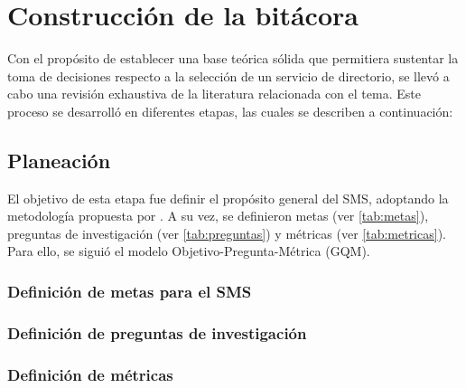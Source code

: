 \section{Construcción de la bitácora}\label{sec:construccion-bitacora}

Con el propósito de establecer una base teórica sólida que permitiera sustentar la toma de decisiones respecto a la selección de un servicio de directorio, se llevó a cabo una revisión exhaustiva de la literatura relacionada con el tema. Este proceso se desarrolló en diferentes etapas, las cuales se describen a continuación:


\subsection{Planeación}\label{subsec:planeacion}

El objetivo de esta etapa fue definir el propósito general del \ac{SMS}, adoptando la metodología propuesta por \citet{Sepulveda2021}. A su vez, se definieron metas (ver \autoref{tab:metas}), preguntas de investigación (ver \autoref{tab:preguntas}) y métricas (ver \autoref{tab:metricas}). Para ello, se siguió el modelo Objetivo-Pregunta-Métrica (\acs{GQM}).


\subsubsection{Definición de metas para el \texorpdfstring{\ac{SMS}}{SMS}}



\subsubsection{Definición de preguntas de investigación}\label{subsubsec:rq-def}



\subsubsection{Definición de métricas}

